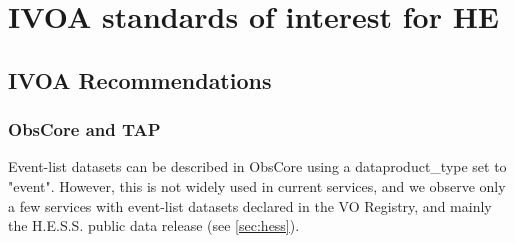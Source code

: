 \documentclass[11pt,a4paper]{ivoa}
\begin{document}
%
%
%
%
%


\section{IVOA standards of interest for HE}

\subsection{IVOA Recommendations}

\subsubsection{ObsCore and TAP}

Event-list datasets can be described in ObsCore using a dataproduct\_type set to "event". However, this is not widely used in current services, and we observe only a few services with event-list datasets declared in the VO Registry, and mainly the H.E.S.S. public data release (see \ref{sec:hess}).
\end{document}
